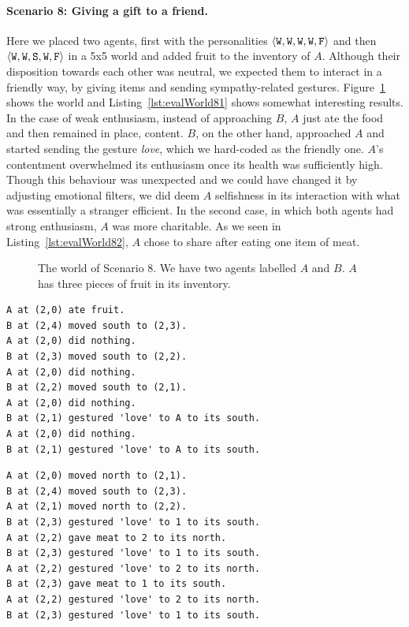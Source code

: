 \paragraph{Scenario 8: Giving a gift to a friend.} Here we placed two agents, first with the personalities $\langle \mathtt{W},\mathtt{W}, \mathtt{W}, \mathtt{W}, \mathtt{F} \rangle$ and then $\langle \mathtt{W},\mathtt{W}, \mathtt{S}, \mathtt{W}, \mathtt{F} \rangle$ in a 5x5 world and added fruit to the inventory of $A$. Although their disposition towards each other was neutral, we expected them to interact in a friendly way, by giving items and sending sympathy-related gestures. Figure~\ref{fig:evalWorld8} shows the world and Listing~\ref{lst:evalWorld81} shows somewhat interesting results. In the case of weak enthusiasm, instead of approaching $B$, $A$ just ate the food and then remained in place, content. $B$, on the other hand, approached $A$ and started sending the gesture \emph{love}, which we hard-coded as the friendly one. $A$'s contentment overwhelmed its enthusiasm once its health was sufficiently high. Though this behaviour was unexpected and we could have changed it by adjusting emotional filters, we did deem $A$ selfishness in its interaction with what was essentially a stranger efficient. In the second case, in which both agents had strong enthusiasm, $A$ was more charitable. As we seen in Listing~\ref{lst:evalWorld82}, $A$ chose to share after eating one item of meat.

\begin{figure}[t]
    \centering
    
    \caption{The world of Scenario 8. We have two agents labelled $A$ and $B$. $A$ has three pieces of fruit in its inventory.}
    \label{fig:evalWorld8}
\end{figure}

\begin{lstlisting}[caption=Actions in Scenario 8 when both agents had the personality $\personality{W}{W}{W}{W}{F}$., label=lst:evalWorld81, float=t]
A at (2,0) ate fruit.
B at (2,4) moved south to (2,3).
A at (2,0) did nothing.
B at (2,3) moved south to (2,2).
A at (2,0) did nothing.
B at (2,2) moved south to (2,1).
A at (2,0) did nothing.
B at (2,1) gestured 'love' to A to its south.
A at (2,0) did nothing.
B at (2,1) gestured 'love' to A to its south.
\end{lstlisting}

\begin{lstlisting}[caption=Actions in Scenario 8 when both agents had the personality $\personality{W}{W}{S}{W}{F}$., label=lst:evalWorld82, float=t]
A at (2,0) moved north to (2,1).
B at (2,4) moved south to (2,3).
A at (2,1) moved north to (2,2).
B at (2,3) gestured 'love' to 1 to its south.
A at (2,2) gave meat to 2 to its north.
B at (2,3) gestured 'love' to 1 to its south.
A at (2,2) gestured 'love' to 2 to its north.
B at (2,3) gave meat to 1 to its south.
A at (2,2) gestured 'love' to 2 to its north.
B at (2,3) gestured 'love' to 1 to its south.
\end{lstlisting}

